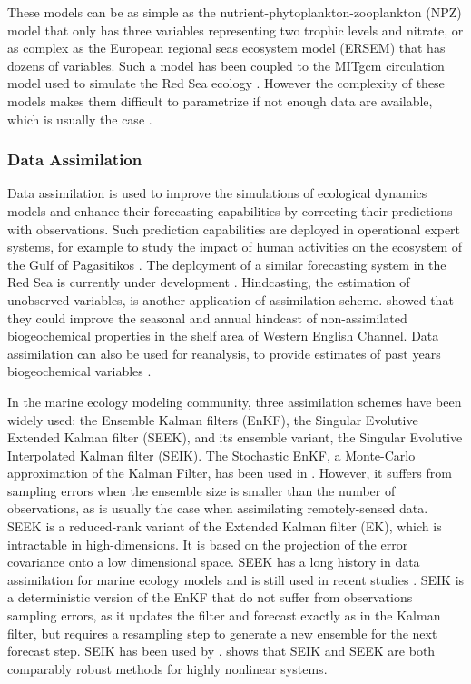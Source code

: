 These models can be as simple as the nutrient-phytoplankton-zooplankton (NPZ) 
model that only has three variables representing two trophic levels and nitrate, 
or as complex as the European regional seas ecosystem model (ERSEM) that has 
dozens of variables. Such a model has been coupled to the MITgcm circulation 
model used to simulate the Red Sea ecology \citep{Triantafyllou2014}. However 
the complexity of these models makes them difficult to parametrize if not enough 
data are available, which is usually the case \citep{Anderson2005}.

\subsubsection{Data Assimilation}

Data assimilation is used to improve the simulations of ecological dynamics 
models and enhance their forecasting capabilities by correcting their 
predictions with observations. Such prediction capabilities are deployed in 
operational expert systems, for example to study the impact of human activities 
on the ecosystem of the Gulf of Pagasitikos \citep{Korres2012}. The deployment 
of a similar forecasting system in the Red Sea is currently under development 
\citep{Triantafyllou2014}. Hindcasting, the estimation of unobserved variables, 
is another application of assimilation scheme. \citet{Ciavatta2011}  showed that 
they could improve the seasonal and annual hindcast of non-assimilated 
biogeochemical properties in the shelf area of Western English Channel. Data 
assimilation can also be used for reanalysis, to provide estimates of past years 
biogeochemical variables \citep{Fontana2013}. 

In the marine ecology modeling community, three assimilation schemes have been 
widely used: the Ensemble Kalman filters (EnKF), the Singular Evolutive Extended 
Kalman filter (SEEK), and its ensemble variant, the Singular Evolutive 
Interpolated Kalman filter (SEIK). The Stochastic EnKF, a Monte-Carlo 
approximation of the Kalman Filter, has been used in \citet{Ciavatta2011, 
Ciavatta2014}. However, it suffers from sampling errors when the ensemble size 
is smaller than the number of observations, as is usually the case when 
assimilating remotely-sensed data. SEEK is a reduced-rank variant of the 
Extended Kalman filter (EK), which is intractable in high-dimensions. It is 
based  on the projection of the error covariance onto a low dimensional space. 
SEEK has a long history in data assimilation for marine ecology models and is 
still used in recent studies \citep{Fontana2013, Korres2012, Butenschon2012}. 
SEIK is a deterministic version of the EnKF that do not suffer from observations 
sampling errors, as it updates the filter and forecast exactly as in the Kalman 
filter, but requires a resampling step to generate a new ensemble for the next 
forecast step. SEIK has been used by \citep{Triantafyllou2012, Korres2012}. 
\citet{Korres2012} shows that SEIK and SEEK are both comparably robust methods 
for highly nonlinear systems.

